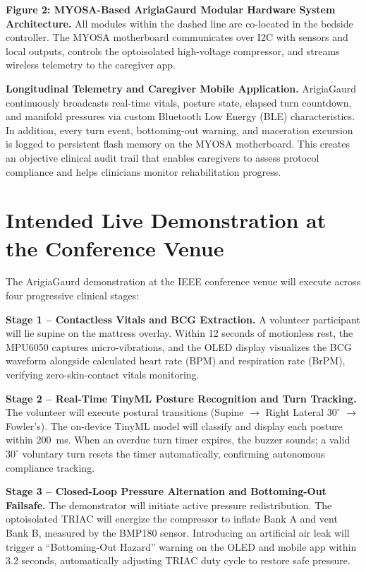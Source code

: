 ﻿\documentclass[11pt,a4paper]{article}
\begin{document}
\noindent \textbf{Figure 2: MYOSA-Based ArigiaGaurd Modular Hardware System Architecture.} All modules within the dashed line are co-located in the bedside controller. The MYOSA motherboard communicates over I2C with sensors and local outputs, controls the optoisolated high-voltage compressor, and streams wireless telemetry to the caregiver app.

\vspace{0.12em}
\noindent \textbf{Longitudinal Telemetry and Caregiver Mobile Application.} ArigiaGaurd continuously broadcasts real-time vitals, posture state, elapsed turn countdown, and manifold pressures via custom Bluetooth Low Energy (BLE) characteristics. In addition, every turn event, bottoming-out warning, and maceration excursion is logged to persistent flash memory on the MYOSA motherboard. This creates an objective clinical audit trail that enables caregivers to assess protocol compliance and helps clinicians monitor rehabilitation progress.

\section{Intended Live Demonstration at the Conference Venue}
The ArigiaGaurd demonstration at the IEEE conference venue will execute across four progressive clinical stages:

\noindent \textbf{Stage 1 -- Contactless Vitals and BCG Extraction.} A volunteer participant will lie supine on the mattress overlay. Within 12 seconds of motionless rest, the MPU6050 captures micro-vibrations, and the OLED display visualizes the BCG waveform alongside calculated heart rate (BPM) and respiration rate (BrPM), verifying zero-skin-contact vitals monitoring.

\noindent \textbf{Stage 2 -- Real-Time TinyML Posture Recognition and Turn Tracking.} The volunteer will execute postural transitions (Supine $\rightarrow$ Right Lateral $30^\circ$ $\rightarrow$ Fowler's). The on-device TinyML model will classify and display each posture within 200~ms. When an overdue turn timer expires, the buzzer sounds; a valid $30^\circ$ voluntary turn resets the timer automatically, confirming autonomous compliance tracking.

\noindent \textbf{Stage 3 -- Closed-Loop Pressure Alternation and Bottoming-Out Failsafe.} The demonstrator will initiate active pressure redistribution. The optoisolated TRIAC will energize the compressor to inflate Bank A and vent Bank B, measured by the BMP180 sensor. Introducing an artificial air leak will trigger a ``Bottoming-Out Hazard'' warning on the OLED and mobile app within 3.2 seconds, automatically adjusting TRIAC duty cycle to restore safe pressure.
\end{document}
